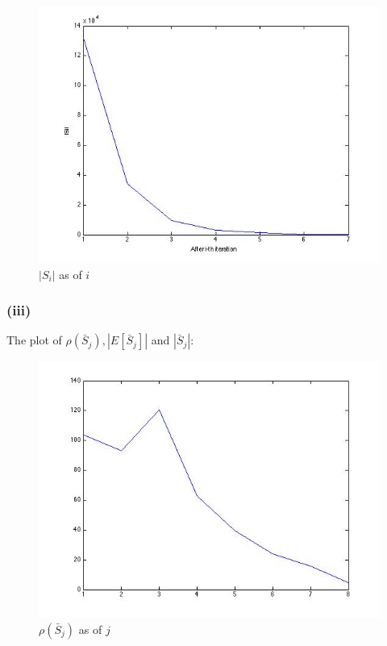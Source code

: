\documentclass{article}
\begin{document}
\begin{figure}[H]
\centering
\includegraphics[scale=0.5]{q4-Si.jpg}
\caption{ $|S_i|$ as of $i$ }
\label{}
\end{figure}

\subsubsection{(iii)}

The plot of $\rho(\bar S_j), |E[\bar S_j]|$ and $|\bar S_j|$: \\

\begin{figure}[H]
\centering
\includegraphics[scale=0.5]{q4c-rho.jpg}
\caption{ $\rho(\bar S_j)$ as of $j$}
\label{}
\end{figure}
\end{document}
